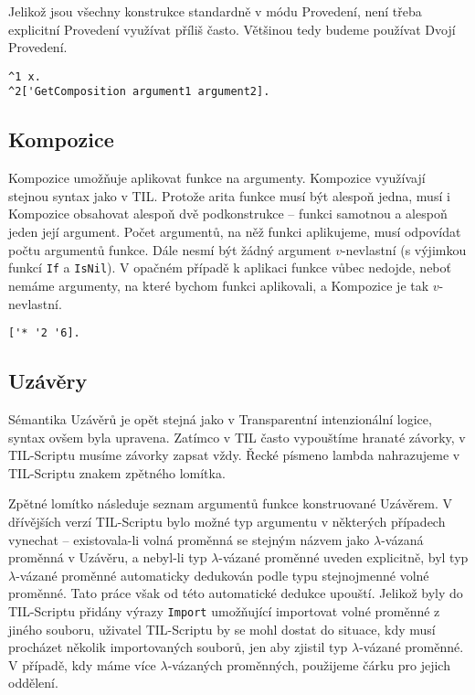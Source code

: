 Jelikož jsou všechny konstrukce standardně v módu Provedení, není třeba explicitní Provedení
využívat příliš často. Většinou tedy budeme používat Dvojí Provedení.

\begin{lstlisting}[caption={Příklad využití Provedení}]
^1 x.
^2['GetComposition argument1 argument2].
\end{lstlisting}

\subsection{Kompozice}

Kompozice umožňuje aplikovat funkce na argumenty. Kompozice využívají stejnou syntax jako v TIL.
Protože arita funkce musí být alespoň jedna, musí i Kompozice obsahovat alespoň dvě podkonstrukce
-- funkci samotnou a alespoň jeden její argument. Počet argumentů, na něž funkci aplikujeme, musí
odpovídat počtu argumentů funkce. Dále nesmí být žádný argument $v$-nevlastní (s výjimkou funkcí
\lstinline{If} a \lstinline{IsNil}). V opačném případě k aplikaci funkce vůbec nedojde, neboť
nemáme argumenty, na které bychom funkci aplikovali, a Kompozice je tak $v$-nevlastní.

\begin{lstlisting}[caption={Příklad využití Kompozice}]
['* '2 '6].
\end{lstlisting}

\subsection{Uzávěry}

Sémantika Uzávěrů je opět stejná jako v Transparentní intenzionální logice, syntax ovšem byla
upravena. Zatímco v TIL často vypouštíme hranaté závorky, v TIL-Scriptu musíme závorky zapsat vždy.
Řecké písmeno lambda nahrazujeme v TIL-Scriptu znakem zpětného lomítka.

Zpětné lomítko následuje seznam argumentů funkce konstruované Uzávěrem. V dřívějších verzí
TIL-Scriptu bylo možné typ argumentu v některých případech vynechat -- existovala-li volná proměnná
se stejným názvem jako $\lambda$-vázaná proměnná v Uzávěru, a nebyl-li typ $\lambda$-vázané
proměnné uveden explicitně, byl typ $\lambda$-vázané proměnné automaticky dedukován podle typu
stejnojmenné volné proměnné. Tato práce však od této automatické dedukce upouští. Jelikož byly
do TIL-Scriptu přidány výrazy \lstinline{Import} umožňující importovat volné proměnné z jiného
souboru, uživatel TIL-Scriptu by se mohl dostat do situace, kdy musí procházet několik
importovaných souborů, jen aby zjistil typ $\lambda$-vázané proměnné. V případě, kdy máme více
$\lambda$-vázaných proměnných, použijeme čárku pro jejich oddělení.

